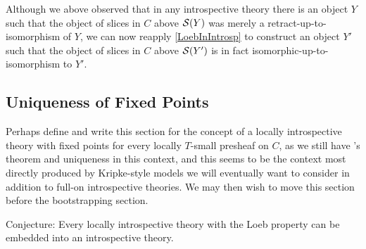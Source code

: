 \begin{observation}
Although we above observed that in any introspective theory there is an object $Y$ such that the object of slices in $C$ above $\mathcal{S}(Y)$ was merely a retract-up-to-isomorphism of $Y$, we can now reapply \cref{LoebInIntrosp} to construct an object $Y'$ such that the object of slices in $C$ above $\mathcal{S}(Y')$ is in fact isomorphic-up-to-isomorphism to $Y'$. 
\end{observation}

\subsection{Uniqueness of Fixed Points}
\begin{TODOblock}
Perhaps define and write this section for the concept of a locally introspective theory with fixed points for every locally $T$-small presheaf on $C$, as we still have \Loeb's theorem and uniqueness in this context, and this seems to be the context most directly produced by Kripke-style models we will eventually want to consider in addition to full-on introspective theories. We may then wish to move this section before the bootstrapping section.

Conjecture: Every locally introspective theory with the Loeb property can be embedded into an introspective theory.
\end{TODOblock}

